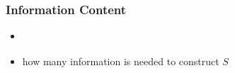 \begin{frame}
	\frametitle{Information Content}
	
	\begin{itemize}
		\item \cite{Vassilev.2000}
		\item how many information is needed to construct $S$
	\end{itemize}
	
\end{frame}